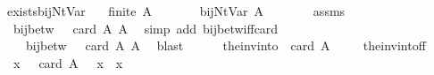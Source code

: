 \begin{isabellebody}
\isanewline
{}\isamarkupfalse%
\ exists{\isacharunderscore}{\kern0pt}bij{\isacharunderscore}{\kern0pt}Nt{\isacharunderscore}{\kern0pt}Var{\isacharcolon}{\kern0pt}\isanewline
\ \ \ {\isachardoublequoteopen}finite\ A{\isachardoublequoteclose}\isanewline
\ \ \ \ \ {\isachardoublequoteopen}{\isasymexists}{\isasymgamma}\ {\isasymgamma}{\isacharprime}{\kern0pt}{\isachardot}{\kern0pt}\ bij{\isacharunderscore}{\kern0pt}Nt{\isacharunderscore}{\kern0pt}Var\ A\ {\isasymgamma}\ {\isasymgamma}{\isacharprime}{\kern0pt}{\isachardoublequoteclose}\isanewline
%
\isadelimproof
%
\endisadelimproof
%
\isatagproof
{}\isamarkupfalse%
\ {\isacharminus}{\kern0pt}\isanewline
\ \ \isamarkupfalse%
\ assms\ \isamarkupfalse%
\ {\isachardoublequoteopen}{\isasymexists}{\isasymgamma}{\isachardot}{\kern0pt}\ bij{\isacharunderscore}{\kern0pt}betw\ {\isasymgamma}\ {\isacharbraceleft}{\kern0pt}{\isachardot}{\kern0pt}{\isachardot}{\kern0pt}{\isacharless}{\kern0pt}\ card\ A{\isacharbraceright}{\kern0pt}\ A{\isachardoublequoteclose}\ \isamarkupfalse%
\ {\isacharparenleft}{\kern0pt}simp\ add{\isacharcolon}{\kern0pt}\ bij{\isacharunderscore}{\kern0pt}betw{\isacharunderscore}{\kern0pt}iff{\isacharunderscore}{\kern0pt}card{\isacharparenright}{\kern0pt}\isanewline
\ \ \isamarkupfalse%
\ \isamarkupfalse%
\ {\isasymgamma}\ \ {}{\isacharcolon}{\kern0pt}\ {\isachardoublequoteopen}bij{\isacharunderscore}{\kern0pt}betw\ {\isasymgamma}\ {\isacharbraceleft}{\kern0pt}{\isachardot}{\kern0pt}{\isachardot}{\kern0pt}{\isacharless}{\kern0pt}\ card\ A{\isacharbraceright}{\kern0pt}\ A{\isachardoublequoteclose}\ \isamarkupfalse%
\ blast\isanewline
\ \ \isamarkupfalse%
\ {\isacharquery}{\kern0pt}{\isasymgamma}{\isacharprime}{\kern0pt}\ {\isacharequal}{\kern0pt}\ {\isachardoublequoteopen}the{\isacharunderscore}{\kern0pt}inv{\isacharunderscore}{\kern0pt}into\ {\isacharbraceleft}{\kern0pt}{\isachardot}{\kern0pt}{\isachardot}{\kern0pt}{\isacharless}{\kern0pt}\ card\ A{\isacharbraceright}{\kern0pt}\ {\isasymgamma}{\isachardoublequoteclose}\isanewline
\ \ \isamarkupfalse%
\ the{\isacharunderscore}{\kern0pt}inv{\isacharunderscore}{\kern0pt}into{\isacharunderscore}{\kern0pt}f{\isacharunderscore}{\kern0pt}f\ {}\ \isamarkupfalse%
\ {}{\isacharcolon}{\kern0pt}\ {\isachardoublequoteopen}{\isasymforall}x\ {\isasymin}\ {\isacharbraceleft}{\kern0pt}{\isachardot}{\kern0pt}{\isachardot}{\kern0pt}{\isacharless}{\kern0pt}\ card\ A{\isacharbraceright}{\kern0pt}{\isachardot}{\kern0pt}\ {\isacharquery}{\kern0pt}{\isasymgamma}{\isacharprime}{\kern0pt}\ {\isacharparenleft}{\kern0pt}{\isasymgamma}\ x{\isacharparenright}{\kern0pt}\ {\isacharequal}{\kern0pt}\ x{\isachardoublequoteclose}\ \isamarkupfalse%

\end{isabellebody}
